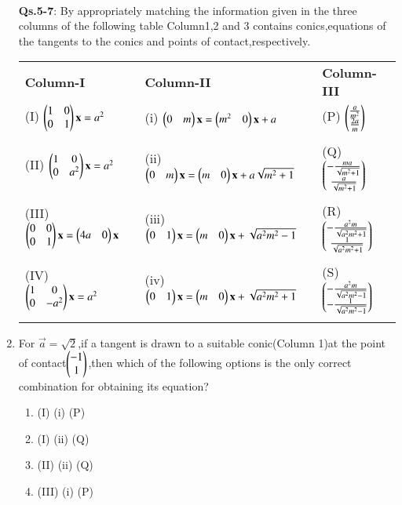 \begin{enumerate}[label=\arabic*.,ref=\thesubsection.\theenumi]
\begin{tabular}{ c c c c }
\end{tabular}\\
    \textbf{Qs.5-7}: By appropriately matching the information given in the three columns of the following table Column1,2 and 3 contains conics,equations of the tangents to the conics and points of contact,respectively.
    \begin{tabular}{llllll}
    \textbf{Column-I} &\enspace &\textbf{Column-II}&\enspace  &\textbf{Column-III}\\
    (I) $\begin{pmatrix}1&0\\0&1\end{pmatrix}\mathbf{x}=a^2$&\enspace &
    (i) $\begin{pmatrix}0&m\end{pmatrix}\mathbf{x}=\begin{pmatrix}m^2&0\end{pmatrix}\mathbf{x}+a$ &\enspace & 
    (P) $\begin{pmatrix}\frac{a}{m^2}\\\frac{2a}{m}\end{pmatrix}$\\ &&&\\
    (II) $\begin{pmatrix}1&0\\0&a^2\end{pmatrix}\mathbf{x}=a^2$&\enspace &
    (ii) $\begin{pmatrix}0&m\end{pmatrix}\mathbf{x}=\begin{pmatrix}m&0\end{pmatrix}\mathbf{x}+a\sqrt{m^2+1}$ &\enspace &  (Q) $\begin{pmatrix}-\frac{ma}{\sqrt{m^2+1}}\\\frac{a}{\sqrt{m^2+1}}\end{pmatrix}$\\ &&&\\
    (III) $\begin{pmatrix}0&0\\0&1\end{pmatrix}\mathbf{x}=\begin{pmatrix}4a&0\end{pmatrix}\mathbf{x}$&   \enspace   & (iii) $\begin{pmatrix}0&1\end{pmatrix}\mathbf{x}=\begin{pmatrix}m&0\end{pmatrix}\mathbf{x}+\sqrt{a^2m^2-1}$ &\enspace & (R) $\begin{pmatrix}-\frac{a^2m}{\sqrt{a^2m^2+1}}\\\frac{1}{\sqrt{a^2m^2+1}}\end{pmatrix}$\\ &&&\\
    (IV) $\begin{pmatrix}1&0\\0&-a^2\end{pmatrix}\mathbf{x}=a^2$&\enspace & 
    (iv) $\begin{pmatrix}0&1\end{pmatrix}\mathbf{x}=\begin{pmatrix}m&0\end{pmatrix}\mathbf{x}+\sqrt{a^2m^2+1}$ & \enspace & (S) $\begin{pmatrix}-\frac{a^2m}{\sqrt{a^2m^2-1}}\\-\frac{1}{\sqrt{a^2m^2-1}}\end{pmatrix}$\\ &&&\\
    \end{tabular}
    \item For $\vec{a}=\sqrt{2}$,if a tangent is drawn to a suitable conic(Column 1)at the point of contact$\begin{pmatrix}-1\\1\end{pmatrix}$,then which of the following options is the only correct combination for obtaining its equation?
    \begin{enumerate}
    \item (I)  (i)  (P)
    \item (I)  (ii)  (Q)
    \item (II)  (ii)  (Q)
    \item (III)  (i)  (P)

\end{enumerate}
\end{enumerate}
